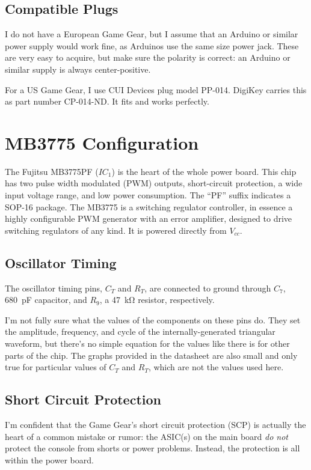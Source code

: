 \documentclass{article}
\newcommand{\Vcc}{$V_{cc}$}
\newcommand{\model}{\textsf}
\begin{document}
\subsection{Compatible Plugs}
I do not have a European Game Gear, but I assume that an Arduino or
similar power supply would work fine, as Arduinos use the same size
power jack. These are very easy to acquire, but make sure the polarity
is correct: an Arduino or similar supply is always center-positive.

For a US Game Gear, I use CUI Devices plug model
\model{PP-014}. DigiKey carries this as part number
\model{CP-014-ND}. It fits and works perfectly.

\section{\model{MB3775} Configuration}
The Fujitsu \model{MB3775PF} ($IC_1$) is the heart of the whole power
board. This chip has two pulse width modulated (PWM) outputs,
short-circuit protection, a wide input voltage range, and low power
consumption. The ``\model{PF}'' suffix indicates a \model{SOP-16}
package. The \model{MB3775} is a switching regulator controller, in
essence a highly configurable PWM generator with an error amplifier,
designed to drive switching regulators of any kind. It is powered
directly from \Vcc{}.

\subsection{Oscillator Timing}
The oscillator timing pins, $C_T$ and $R_T$, are connected to ground
through $C_7$, \qty{680}{\pico\farad} capacitor, and $R_9$, a
\qty{47}{\kilo\ohm} resistor, respectively.

I'm not fully sure what the values of the components on these pins
do. They set the amplitude, frequency, and cycle of the
internally-generated triangular waveform, but there's no simple
equation for the values like there is for other parts of the chip. The
graphs provided in the datasheet are also small and only true for
particular values of $C_T$ and $R_T$, which are not the values used
here.

\subsection{Short Circuit Protection}
\label{sec:scp}
I'm confident that the Game Gear's short circuit protection (SCP) is
actually the heart of a common mistake or rumor: the ASIC(s) on the
main board \emph{do not} protect the console from shorts or power
problems. Instead, the protection is all within the power board.
\end{document}

